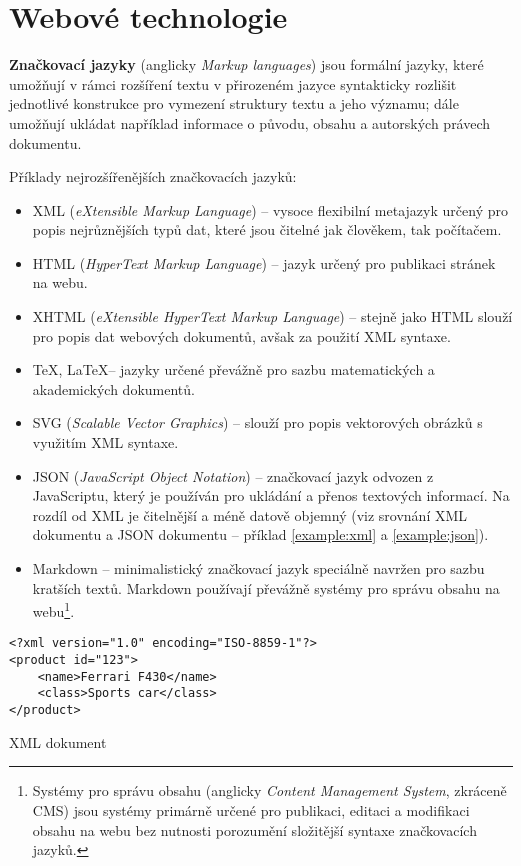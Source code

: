 \chapter{Webové technologie}
\label{chap:languages}

\textbf{Značkovací jazyky} (anglicky \textit{Markup languages}) jsou formální jazyky, které umožňují v rámci rozšíření textu v přirozeném jazyce syntakticky rozlišit jednotlivé konstrukce pro vymezení struktury textu a jeho významu; dále umožňují ukládat například informace o původu, obsahu a autorských právech dokumentu. \cite{14} \cite{16}

Příklady nejrozšířenějších značkovacích jazyků:

\begin{itemize}
    \item XML (\textit{eXtensible Markup Language}) -- vysoce flexibilní metajazyk určený pro popis nejrůznějších typů dat, které jsou čitelné jak člověkem, tak počítačem.
    \item HTML (\textit{HyperText Markup Language}) -- jazyk určený pro publikaci stránek na webu.
    \item XHTML (\textit{eXtensible HyperText Markup Language}) -- stejně jako HTML slouží pro popis dat webových dokumentů, avšak za použití XML syntaxe.
    \item \TeX, \LaTeX -- jazyky určené převážně pro sazbu matematických a akademických dokumentů.
    \item SVG (\textit{Scalable Vector Graphics}) -- slouží pro popis vektorových obrázků s využitím XML syntaxe.
    \item JSON (\textit{JavaScript Object Notation}) -- značkovací jazyk odvozen z JavaScriptu, který je používán pro ukládání a přenos textových informací. Na rozdíl od XML je čitelnější a méně datově objemný (viz srovnání XML dokumentu a JSON dokumentu -- příklad \ref{example:xml} a \ref{example:json}).
    \item Markdown -- minimalistický značkovací jazyk speciálně navržen pro sazbu kratších textů. Markdown používají převážně systémy pro správu obsahu na webu\footnote{Systémy pro správu obsahu (anglicky \textit{Content Management System}, zkráceně CMS) jsou systémy primárně určené pro publikaci, editaci a modifikaci obsahu na webu bez nutnosti porozumění složitější syntaxe značkovacích jazyků.}.
\end{itemize}

\begin{example}
    \centering
    \begin{lstlisting}
<?xml version="1.0" encoding="ISO-8859-1"?>
<product id="123">
    <name>Ferrari F430</name>
    <class>Sports car</class>
</product>
    \end{lstlisting}
    \caption{XML dokument}
    \label{example:xml}
\end{example}

